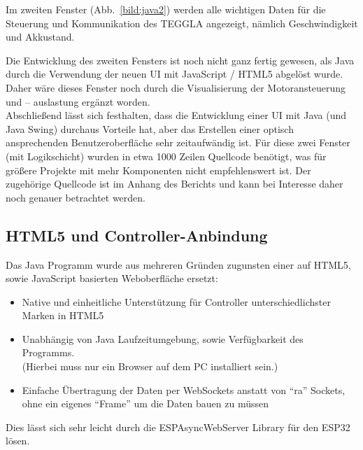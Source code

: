 Im zweiten Fenster (Abb.~\ref{bild:java2}) werden alle wichtigen Daten für die Steuerung
und Kommunikation des TEGGLA angezeigt, nämlich Geschwindigkeit und Akkustand.

Die Entwicklung des zweiten Fensters ist noch nicht ganz fertig gewesen, als Java
durch die Verwendung der neuen UI mit JavaScript / HTML5 abgelöst wurde. Daher
wäre dieses Fenster noch durch die Visualisierung der Motoransteuerung und –
auslastung ergänzt worden.\\

Abschließend lässt sich festhalten, dass die Entwicklung einer UI mit Java (und Java Swing) durchaus Vorteile hat, aber das Erstellen einer optisch ansprechenden Benutzeroberfläche sehr zeitaufwändig ist. 
Für diese zwei Fenster (mit Logikschicht) wurden in etwa 1000 Zeilen Quellcode benötigt, was für größere Projekte mit mehr Komponenten nicht empfehlenswert ist. 
Der zugehörige Quellcode ist im Anhang des Berichts und kann bei Interesse daher noch genauer betrachtet werden.



\subsection{HTML5 und Controller-Anbindung}

Das Java Programm wurde aus mehreren Gründen zugunsten einer auf HTML5, sowie JavaScript basierten Weboberfläche ersetzt:\par

\begin{itemize}
	\item Native und einheitliche Unterstützung für Controller unterschiedlichster Marken in HTML5\par
	
	\item Unabhängig von Java Laufzeitumgebung, sowie Verfügbarkeit des Programms.\\
	(Hierbei muss nur ein Browser auf dem PC installiert sein.)\par
	
	\item Einfache Übertragung der Daten per WebSockets anstatt von ``ra''  Sockets, ohne ein eigenes ``Frame'' um die Daten bauen zu müssen
\end{itemize}\par


\vspace{\baselineskip}
Dies lässt sich sehr leicht durch die ESPAsyncWebServer Library für den ESP32 lösen. \par

